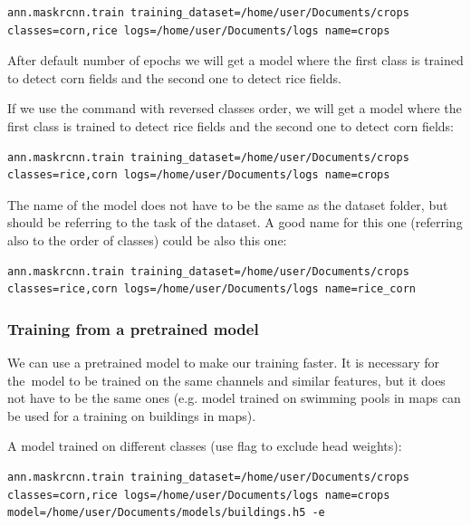 {\footnotesize
\begin{lstlisting}[breaklines=true]
ann.maskrcnn.train training_dataset=/home/user/Documents/crops classes=corn,rice logs=/home/user/Documents/logs name=crops
\end{lstlisting}
}

After default number of epochs we will get a model where the first class is
trained to detect corn fields and the second one to detect rice fields. 

If we use the command with reversed classes order, we will get a model where the
first class is trained to detect rice fields and the second one to detect corn
fields:

{\footnotesize
\begin{lstlisting}[breaklines=true]
ann.maskrcnn.train training_dataset=/home/user/Documents/crops classes=rice,corn logs=/home/user/Documents/logs name=crops
\end{lstlisting}
}

The name of the model does not have to be the same as the dataset folder, but
should be referring to the task of the dataset. A good name for this one
(referring also to the order of classes) could be also this one: 

{\footnotesize
\begin{lstlisting}[breaklines=true]
ann.maskrcnn.train training_dataset=/home/user/Documents/crops classes=rice,corn logs=/home/user/Documents/logs name=rice_corn
\end{lstlisting}
}

\subsubsection*{Training from a pretrained model}
We can use a pretrained model to make our training faster. It is necessary for
the~model to be trained on the same channels and similar features, but it does
not have to be the same ones (e.g. model trained on swimming pools in maps can
be used for a training on buildings in maps). 

A model trained on different classes (use  flag to
exclude head weights):

{\footnotesize
\begin{lstlisting}[breaklines=true]
ann.maskrcnn.train training_dataset=/home/user/Documents/crops classes=corn,rice logs=/home/user/Documents/logs name=crops model=/home/user/Documents/models/buildings.h5 -e
\end{lstlisting}
}

